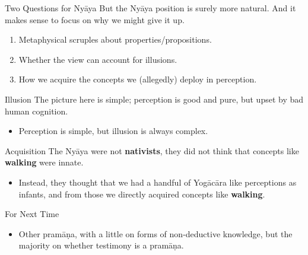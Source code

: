 \documentclass[
  17pt,
  letterpaper,
  ignorenonframetext,
  aspectratio=169,
  handout]{beamer}
\providecommand{\tightlist}{%
  \setlength{\itemsep}{0pt}\setlength{\parskip}{0pt}}\usepackage{longtable,booktabs,array}
\begin{document}
\begin{frame}{Two Questions for Nyāya}
\protect\hypertarget{two-questions-for-nyux101ya}{}
But the Nyāya position is surely more natural. And it makes sense to
focus on why we might give it up.

\begin{enumerate}[<+->]
\tightlist
\item
  Metaphysical scruples about properties/propositions.
\item
  Whether the view can account for illusions.
\item
  How we acquire the concepts we (allegedly) deploy in perception.
\end{enumerate}
\end{frame}

\begin{frame}{Illusion}
\protect\hypertarget{illusion}{}
The picture here is simple; perception is good and pure, but upset by
bad human cognition.

\begin{itemize}[<+->]
\tightlist
\item
  Perception is simple, but illusion is always complex.
\end{itemize}
\end{frame}

\begin{frame}{Acquisition}
\protect\hypertarget{acquisition}{}
The Nyāya were not \textbf{nativists}, they did not think that concepts
like \textbf{walking} were innate.

\begin{itemize}[<+->]
\tightlist
\item
  Instead, they thought that we had a handful of Yogācāra like
  perceptions as infants, and from those we directly acquired concepts
  like \textbf{walking}.
\end{itemize}
\end{frame}

\begin{frame}{For Next Time}
\protect\hypertarget{for-next-time}{}
\begin{itemize}[<+->]
\tightlist
\item
  Other pramāṇa, with a little on forms of non-deductive knowledge, but
  the majority on whether testimony is a pramāṇa.
\end{itemize}
\end{frame}
\end{document}
